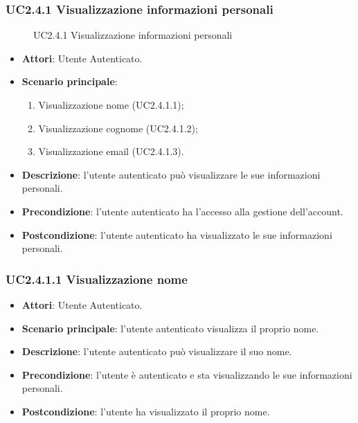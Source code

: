 \subsubsection{UC2.4.1 Visualizzazione informazioni personali}
\begin{figure}[H]
\centering
\noindent{}
\caption{UC2.4.1 Visualizzazione informazioni personali}
\end{figure}
\begin{itemize}
\item \textbf{Attori}: Utente Autenticato.
\item \textbf{Scenario principale}:
\begin{enumerate}
\item Visualizzazione nome (UC2.4.1.1);
\item Visualizzazione cognome (UC2.4.1.2);
\item Visualizzazione email (UC2.4.1.3).
\end{enumerate}
\item \textbf{Descrizione}: l’utente autenticato può visualizzare le sue informazioni personali.
\item \textbf{Precondizione}: l’utente autenticato ha l’accesso alla gestione dell’account.
\item \textbf{Postcondizione}: l’utente autenticato ha visualizzato le sue informazioni personali.
\end{itemize}
\subsubsection{UC2.4.1.1 Visualizzazione nome}
\begin{itemize}
\item \textbf{Attori}: Utente Autenticato.
\item \textbf{Scenario principale}: l'utente autenticato visualizza il proprio nome.
\item \textbf{Descrizione}: l'utente autenticato può visualizzare il suo nome.
\item \textbf{Precondizione}: l'utente è autenticato e sta visualizzando le sue informazioni personali.
\item \textbf{Postcondizione}: l'utente ha visualizzato il proprio nome.
\end{itemize}
